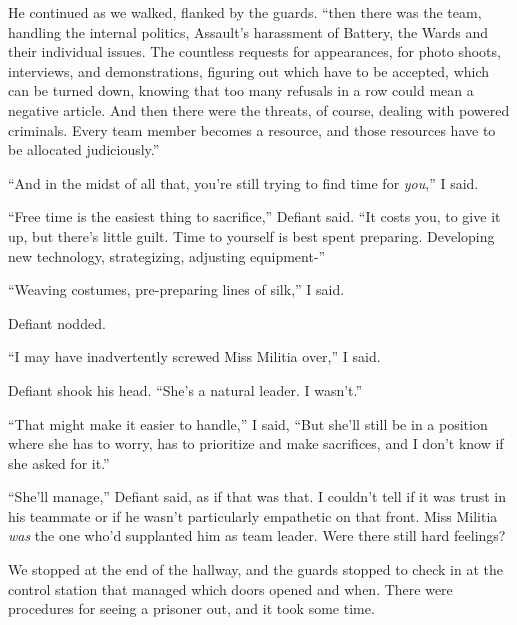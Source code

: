 He continued as we walked, flanked by the guards.  ``\ldotsAnd then there was the team, handling the internal politics, Assault's harassment of Battery, the Wards and their individual issues.  The countless requests for appearances, for photo shoots, interviews, and demonstrations, figuring out which have to be accepted, which can be turned down, knowing that too many refusals in a row could mean a negative article.  And then there were the threats, of course, dealing with powered criminals.  Every team member becomes a resource, and those resources have to be allocated judiciously.''



``And in the midst of all that, you're still trying to find time for \emph{you},'' I said.



``Free time is the easiest thing to sacrifice,'' Defiant said.  ``It costs you, to give it up, but there's little guilt.  Time to yourself is best spent preparing.  Developing new technology, strategizing, adjusting equipment-''



``Weaving costumes, pre-preparing lines of silk,'' I said.



Defiant nodded.



``I may have inadvertently screwed Miss Militia over,'' I said.



Defiant shook his head.  ``She's a natural leader.  I wasn't.''



``That might make it easier to handle,'' I said, ``But she'll still be in a position where she has to worry, has to prioritize and make sacrifices, and I don't know if she asked for it.''



``She'll manage,'' Defiant said, as if that was that.  I couldn't tell if it was trust in his teammate or if he wasn't particularly empathetic on that front.  Miss Militia \emph{was} the one who'd supplanted him as team leader.  Were there still hard feelings?



We stopped at the end of the hallway, and the guards stopped to check in at the control station that managed which doors opened and when.  There were procedures for seeing a prisoner out, and it took some time.



